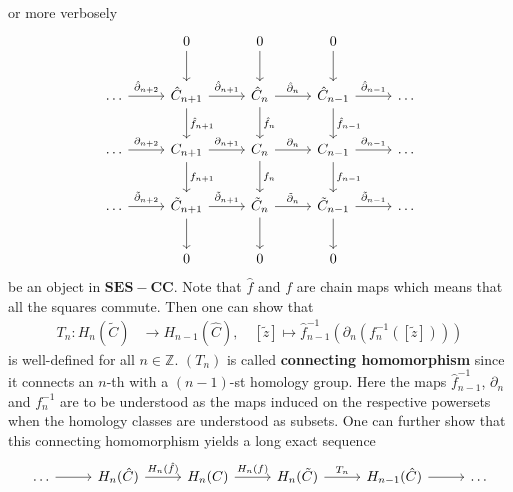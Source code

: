 or more verbosely
\begin{equation*}
\begin{tikzcd}[row sep=2.2em,column sep=2.6em]
  &
  0
  \ar{d}
  &
  0
  \ar{d}
  &
  0
  \ar{d}
  &
  \\
  \ldots
  \ar{r}{\hat{\partial}_{n+2}}
  &
  \hat{C}_{n+1}
  \ar{r}{\hat{\partial}_{n+1}}
  \ar{d}{\hat{f}_{n+1}}
  &
  \hat{C}_{n}
  \ar{r}{\hat{\partial}_{n}}
  \ar{d}{\hat{f}_{n}}
  &
  \hat{C}_{n-1}
  \ar{r}{\hat{\partial}_{n-1}}
  \ar{d}{\hat{f}_{n-1}}
  &
  \ldots
  \\
  \ldots
  \ar{r}{\partial_{n+2}}
  &
  C_{n+1}
  \ar{r}{\partial_{n+1}}
  \ar{d}{f_{n+1}}
  &
  C_{n}
  \ar{r}{\partial_{n}}
  \ar{d}{f_{n}}
  &
  C_{n-1}
  \ar{r}{\partial_{n-1}}
  \ar{d}{f_{n-1}}
  &
  \ldots
  \\
  \ldots
  \ar{r}{\tilde{\partial}_{n+2}}
  &
  \tilde{C}_{n+1}
  \ar{r}{\tilde{\partial}_{n+1}}
  \ar{d}
  &
  \tilde{C}_{n}
  \ar{r}{\tilde{\partial}_{n}}
  \ar{d}
  &
  \tilde{C}_{n-1}
  \ar{r}{\tilde{\partial}_{n-1}}
  \ar{d}
  &
  \ldots
  \\
  &
  0
  &
  0
  &
  0
  &
\end{tikzcd}
\end{equation*}
be an object in $\mathbf{SES-CC}$. Note that $\hat{f}$ and $f$ are chain maps which means that all the squares commute. Then one can show that
\begin{align*}
  T_{n}
  \colon
  H_{n}(\tilde{C})
  &\to
  H_{n-1}(\hat{C})
  ,\quad
  [\tilde{z}]
  \mapsto
  \hat{f}_{n-1}^{-1}
  \left(
    \partial_{n}
    \left(
      f_{n}^{-1}([\tilde{z}])
    \right)
  \right)
\end{align*}
is well-defined for all $n \in \mathbb{Z}$. $(T_{n})$ is called \textbf{connecting homomorphism} since it {\glqq}connects{\grqq} an $n$-th with a $(n-1)$-st homology group. Here the maps $\hat{f}_{n-1}^{-1}$, $\partial_{n}$ and $f_{n}^{-1}$ are to be understood as the maps induced on the respective powersets when the homology classes are understood as subsets. One can further show that this connecting homomorphism yields a long exact sequence
\begin{equation*}
\begin{tikzcd}[row sep=2.2em,column sep=2.6em]
  \ldots
  \ar{r}
  &
  H_{n}(\hat{C})
  \ar{r}{H_{n}(\hat{f})}
  &
  H_{n}(C)
  \ar{r}{H_{n}(f)}
  &
  H_{n}(\tilde{C})
  \ar{r}{T_{n}}
  &
  H_{n-1}(\hat{C})
  \ar{r}
  &
  \ldots
\end{tikzcd}
\end{equation*}
